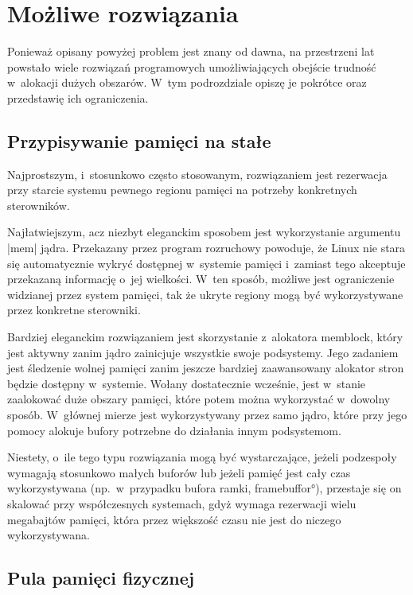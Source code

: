 \section{Możliwe rozwiązania}

Ponieważ opisany powyżej problem jest znany od dawna, na przestrzeni
lat powstało wiele rozwiązań programowych umożliwiających obejście
trudność w~alokacji dużych obszarów.  W~tym podrozdziale opiszę je
pokrótce oraz przedstawię ich ograniczenia.

\subsection{Przypisywanie pamięci na stałe}\label{sec:rezerwe-mem}

Najprostszym, i~stosunkowo często stosowanym, rozwiązaniem jest
rezerwacja przy starcie systemu pewnego regionu pamięci na potrzeby
konkretnych sterowników.

Najłatwiejszym, acz niezbyt eleganckim sposobem jest wykorzystanie
argumentu \code|mem| jądra.  Przekazany przez program rozruchowy
powoduje, że Linux nie stara się automatycznie wykryć dostępnej
w~systemie pamięci  i~zamiast tego akceptuje przekazaną
informację o~jej wielkości.  W~ten sposób, możliwe jest ograniczenie
widzianej przez system pamięci, tak że ukryte regiony mogą być
wykorzystywane przez konkretne sterowniki.

Bardziej eleganckim rozwiązaniem jest skorzystanie z~alokatora
memblock, który jest aktywny zanim jądro zainicjuje wszystkie swoje
podsystemy.  Jego zadaniem jest śledzenie wolnej pamięci zanim jeszcze
bardziej zaawansowany alokator stron będzie dostępny w~systemie.
Wołany dostatecznie wcześnie, jest w~stanie zaalokować duże obszary
pamięci, które potem można wykorzystać w~dowolny sposób.  W~głównej
mierze jest wykorzystywany przez samo jądro, które przy jego pomocy
alokuje bufory potrzebne do działania innym podsystemom.

Niestety, o~ile tego typu rozwiązania mogą być wystarczające, jeżeli
podzespoły wymagają stosunkowo małych buforów lub jeżeli pamięć jest
cały czas wykorzystywana (np.\ w~przypadku bufora ramki,
\ang{framebuffor}), przestaje się on skalować przy współczesnych
systemach, gdyż wymaga rezerwacji wielu megabajtów pamięci, która
przez większość czasu nie jest do niczego wykorzystywana.

\subsection{Pula pamięci fizycznej}\label{sec:intro-pmm}

